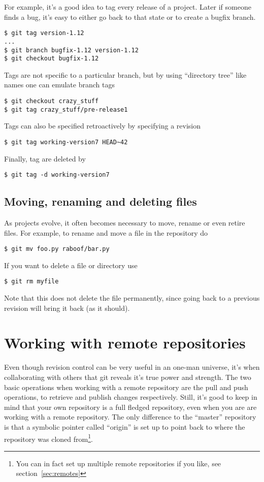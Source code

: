 \documentclass[a4paper,10pt]{article}
\begin{document}
For example, it's a good idea to tag every release of a
project. Later if someone finds a bug, it's easy to either go back to that
state or to create a bugfix branch.
\begin{verbatim}
$ git tag version-1.12
...
$ git branch bugfix-1.12 version-1.12
$ git checkout bugfix-1.12
\end{verbatim}
Tags are not specific to a particular branch, but by using
``directory tree'' like names one can emulate branch tags
\begin{verbatim}
$ git checkout crazy_stuff
$ git tag crazy_stuff/pre-release1
\end{verbatim}
Tags can also be specified retroactively by specifying a revision
\begin{verbatim}
$ git tag working-version7 HEAD~42
\end{verbatim}
Finally, tag are deleted by 
\begin{verbatim}
$ git tag -d working-version7 
\end{verbatim}

\subsection{Moving, renaming and deleting files}
As projects evolve, it often becomes necessary to move, rename or even retire 
files. For example, to rename and move a file in the repository do 
\begin{verbatim}
$ git mv foo.py raboof/bar.py
\end{verbatim}
If you want to delete a file or directory use
\begin{verbatim}
$ git rm myfile
\end{verbatim}
Note that this does not delete the file permanently, since going back to a
previous revision will bring it back (as it should).

\section{Working with remote repositories}
Even though revision control can be very useful in an one-man universe, it's
when collaborating with others that git reveals it's true power and strength.
The two basic operations when working with a remote repository are the pull
and push operations, to retrieve and publish changes respectively. Still, it's
good to keep in mind that your own repository is a full fledged repository,
even when you are are working with a remote repository. The only difference to
the ``master'' repository is that a symbolic pointer called ``origin'' is set
up to point back to where the repository was cloned from\footnote{You can in
fact set up multiple remote repositories if you like, see
section~\ref{sec:remotes}}.
\end{document}
